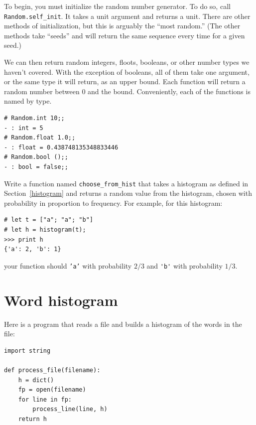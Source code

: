 \documentclass[10pt]{book}
\begin{document}
{

To begin, you must initialize the random number generator. To do so, 
call {\tt Random.self\_init}. It takes a unit argument and returns a 
unit. There are other methods of initialization, but this is arguably
the ``most random.'' (The other methods take ``seeds'' and will return 
the same sequence every time for a given seed.)

We can then return random integers, floots, booleans, or other number types we haven't covered. With the exception of booleans, all of them take one argument, or the same type it will return, as an upper bound. Each function will return a random number between 0 and the bound. Conveniently, each of the functions is named by type.
\beforeverb
\begin{verbatim}
# Random.int 10;;
- : int = 5
# Random.float 1.0;;
- : float = 0.438748135348833446
# Random.bool ();;
- : bool = false;;
\end{verbatim}
\afterverb

\begin{ex}


Write a function named \verb"choose_from_hist" that takes
a histogram as defined in Section~\ref{histogram} and returns a 
random value from the histogram, chosen with probability
in proportion to frequency.  For example, for this histogram:

\beforeverb
\begin{verbatim}
# let t = ["a"; "a"; "b"]
# let h = histogram(t);
>>> print h
{'a': 2, 'b': 1}
\end{verbatim}
\afterverb
%
your function should {\tt 'a'} with probability $2/3$ and \verb"'b'"
with probability $1/3$.
\end{ex}


\section{Word histogram}

Here is a program that reads a file and builds a histogram of the
words in the file:


\beforeverb
\begin{verbatim}
import string

def process_file(filename):
    h = dict()
    fp = open(filename)
    for line in fp:
        process_line(line, h)
    return h


\end{verbatim}}
\end{document}
